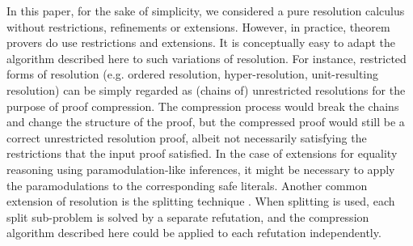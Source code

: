 In this paper, for the sake of simplicity, we considered a pure resolution calculus without restrictions, refinements or extensions. However, in practice, theorem provers do use restrictions and extensions. It is conceptually easy to adapt the algorithm described here to such variations of resolution. For instance, restricted forms of resolution (e.g. ordered resolution, hyper-resolution, unit-resulting resolution) can be simply regarded as (chains of) unrestricted resolutions for the purpose of proof compression. The compression process would break the chains and change the structure of the proof, but the compressed proof would still be a correct unrestricted resolution proof, albeit not necessarily satisfying the restrictions that the input proof satisfied. In the case of extensions for equality reasoning using paramodulation-like inferences, it might be necessary to apply the paramodulations to the corresponding safe literals. Another common extension of resolution is the splitting technique \cite{WeidenbachSplitting}. When splitting is used, each split sub-problem is solved by a separate refutation, and the compression algorithm described here could be applied to each refutation independently.








